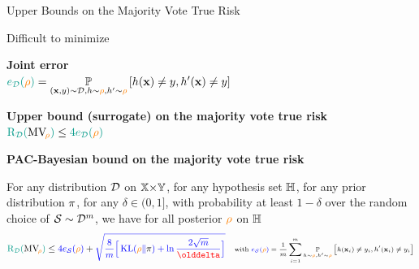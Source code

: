 \documentclass{slides}
\begin{document}

\begin{xframe}{Upper Bounds on the Majority Vote True Risk}

\vspace{-0.3cm}

\begin{xblock}{}
 Difficult to minimize
\end{xblock}

\vspace{0.3cm}

{\bf  Joint error}\\[0.5cm]
\hspace{0.1cm}$\displaystyle  \green{e_{\D}(\Q)} = \PP_{(\x,\y)\sim\D, \h\sim\Q, \h'\sim\Q}\LB\h(\x) \ne \y, \h'(\x) \ne \y\RB$
    
\vspace{0.5cm}
    
{\bf Upper bound (surrogate) on the majority vote true risk}\\[0.5cm]
\hspace{0.1cm}$\displaystyle\green{\Risk_{\D}(\MVQ)} \le \green{4e_{\D}(\Q)}$

\vspace{0.5cm}

{\bf PAC-Bayesian bound on the majority vote true risk} {\scriptsize \citep{MasegosaLorenzenIgelSeldin2020}}

{\scriptsize For any distribution $\D$ on $\X{\times}\Y$, for any hypothesis set $\H$, for any prior distribution $\P$, for any $\delta \in (0, 1]$, with probability at least $1-\delta$ over the random choice of $\dS\sim\D^\m$, we have for all posterior $\Q$ on $\H$}\\[-0.5cm]
\begin{align*}
    \green{\Risk_{\D}(\MVQ)} \le \blue{4e_{\dS}(\Q)} + \blue{\sqrt{\frac{8}{m}\Big[\KL(\orange\Q\|\black{\P}) +\ln\frac{2\sqrt{m}}{\delta}\Big]}} \quad\text{\scriptsize with $\displaystyle\blue{e_{\dS}(\Q)} = \frac{1}{\m}\sum_{i=1}^{\m}\PP_{\h\sim\Q, \h'\sim\Q}\LB\h(\x_i) \ne \y_i, \h'(\x_i) \ne \y_i\RB$}
\end{align*}

\end{xframe}

\end{document}
